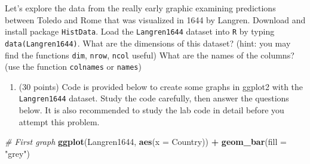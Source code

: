 \documentclass[]{article}
\newenvironment{Shaded}{\begin{snugshade}}{\end{snugshade}}
\newcommand{\CommentTok}[1]{\textcolor[rgb]{0.56,0.35,0.01}{\textit{#1}}}
\newcommand{\DataTypeTok}[1]{\textcolor[rgb]{0.13,0.29,0.53}{#1}}
\newcommand{\KeywordTok}[1]{\textcolor[rgb]{0.13,0.29,0.53}{\textbf{#1}}}
\newcommand{\NormalTok}[1]{#1}
\newcommand{\OperatorTok}[1]{\textcolor[rgb]{0.81,0.36,0.00}{\textbf{#1}}}
\newcommand{\StringTok}[1]{\textcolor[rgb]{0.31,0.60,0.02}{#1}}
\providecommand{\tightlist}{%
  \setlength{\itemsep}{0pt}\setlength{\parskip}{0pt}}
\begin{document}
Let's explore the data from the really early graphic examining
predictions between Toledo and Rome that was visualized in 1644 by
Langren. Download and install package \texttt{HistData}. Load the
\texttt{Langren1644} dataset into \texttt{R} by typing
\texttt{data(Langren1644)}. What are the dimensions of this dataset?
(hint: you may find the functions \texttt{dim}, \texttt{nrow},
\texttt{ncol} useful) What are the names of the columns? (use the
function \texttt{colnames} or \texttt{names})

\begin{Shaded}
\end{Shaded}

\begin{enumerate}
\def\labelenumi{\alph{enumi}.}
\setcounter{enumi}{4}
\tightlist
\item
  (30 points) Code is provided below to create some graphs in ggplot2
  with the \texttt{Langren1644} dataset. Study the code carefully, then
  answer the questions below. It is also recommended to study the lab
  code in detail before you attempt this problem.
\end{enumerate}

\begin{Shaded}
\begin{Highlighting}[]
\CommentTok{# First graph}
\KeywordTok{ggplot}\NormalTok{(Langren1644, }\KeywordTok{aes}\NormalTok{(}\DataTypeTok{x =}\NormalTok{ Country)) }\OperatorTok{+}
\StringTok{  }\KeywordTok{geom_bar}\NormalTok{(}\DataTypeTok{fill =} \StringTok{"grey"}\NormalTok{) }
\end{Highlighting}
\end{Shaded}
\end{document}
